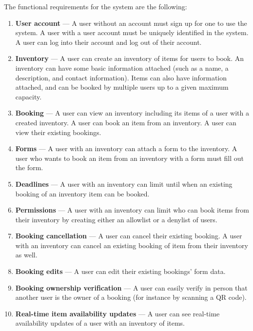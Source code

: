 The functional requirements for the system are the following:
\begin{enumerate}[label=\textbf{F\arabic*}, ref=\labelenumi]
    \item \label{req:user_account} \textbf{User account} --- A user without an account must sign up for one to use the system. A user with a user account must be uniquely identified in the system. A user can log into their account and log out of their account.
    \item \label{req:inventory} \textbf{Inventory} --- A user can create an inventory of items for users to book. An inventory can have some basic information attached (such as a name, a description, and contact information). Items can also have information attached, and can be booked by multiple users up to a given maximum capacity.
    \item \label{req:booking} \textbf{Booking} --- A user can view an inventory including its items of a user with a created inventory. A user can book an item from an inventory. A user can view their existing bookings.
    \item \label{req:forms} \textbf{Forms} --- A user with an inventory can attach a form to the inventory. A user who wants to book an item from an inventory with a form must fill out the form.
    \item \label{req:deadlines} \textbf{Deadlines} --- A user with an inventory can limit until when an existing booking of an inventory item can be booked.
    \item \label{req:permissions} \textbf{Permissions} --- A user with an inventory can limit who can book items from their inventory by creating either an allowlist or a denylist of users.
    \renewcommand{\labelenumi}{\textbf{F\arabic{enumi}}*}
    \item \label{req:cancellation} \textbf{Booking cancellation} --- A user can cancel their existing booking. A user with an inventory can cancel an existing booking of item from their inventory as well.
    \item \label{req:edits} \textbf{Booking edits} --- A user can edit their existing bookings' form data.
    \item \label{req:ownership_verification} \textbf{Booking ownership verification} --- A user can easily verify in person that another user is the owner of a booking (for instance by scanning a QR code).
    \item \label{req:rt_updates} \textbf{Real-time item availability updates} --- A user can see real-time availability updates of a user with an inventory of items.

\end{enumerate}
